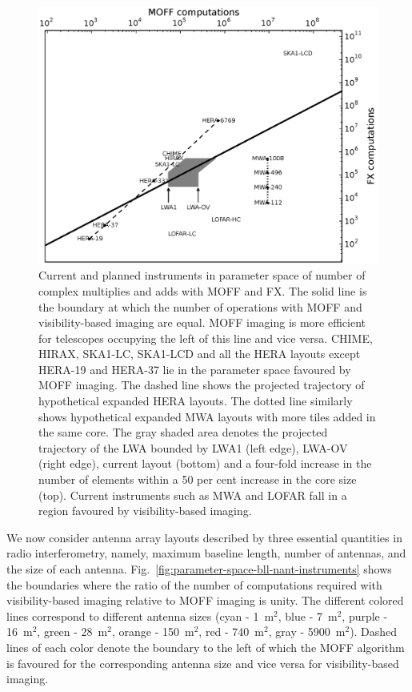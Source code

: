 \documentclass[a4paper,fleqn,usenatbib]{mnras}
\begin{document}
\begin{figure}
  \includegraphics[width=\columnwidth]{figure11}
  \caption{Current and planned instruments in parameter space of
    number of complex multiplies and adds with MOFF and FX. The solid line
    is the boundary at which the number of operations with MOFF and 
    visibility-based imaging are equal. MOFF imaging is more efficient for 
    telescopes occupying the left of this line and vice versa. CHIME, HIRAX, 
    SKA1-LC, SKA1-LCD and all the HERA layouts except HERA-19 and HERA-37 lie 
    in the parameter space favoured by MOFF imaging. The dashed line shows the 
    projected trajectory of hypothetical expanded HERA layouts. The dotted line 
    similarly shows hypothetical expanded MWA layouts with more tiles added in 
    the same core. The gray shaded area denotes the projected trajectory of the 
    LWA bounded by LWA1 (left edge), LWA-OV (right edge), current layout 
    (bottom) and a four-fold increase in the number of elements within a 50 per 
    cent increase in the core size (top). Current instruments such as MWA and 
    LOFAR fall in a region favoured by visibility-based imaging.}
  \label{fig:parameter-space-computations-instruments}
\end{figure}

We now consider antenna array layouts described by three essential quantities in radio interferometry, namely, maximum baseline length, number of antennas, and the size of each antenna. Fig.~\ref{fig:parameter-space-bll-nant-instruments} shows the boundaries where the ratio of the number of computations required with visibility-based imaging relative to MOFF imaging is unity. The different colored lines correspond to different antenna sizes (cyan - 1~m$^2$, blue - 7~m$^2$, purple - 16~m$^2$, green - 28~m$^2$, orange - 150~m$^2$, red - 740~m$^2$, gray - 5900~m$^2$). Dashed lines of each color denote the boundary to the left of which the MOFF algorithm is favoured for the corresponding antenna size and vice versa for visibility-based imaging.
\end{document}

